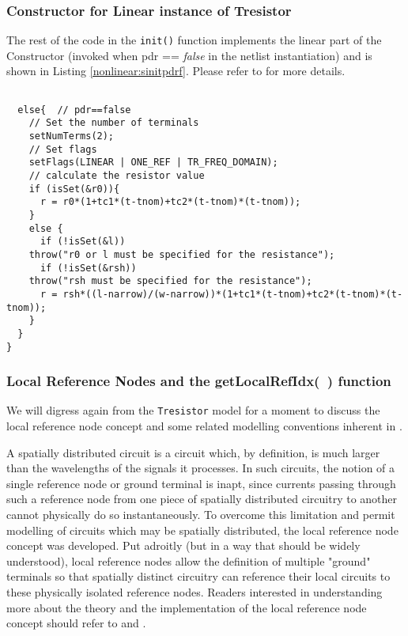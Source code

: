 \subsubsection{Constructor for Linear instance of Tresistor}
The rest of the code in the \texttt{init()} function implements
the linear part of the Constructor (invoked when pdr == \emph{false} in the
netlist instantiation) and is shown in Listing \ref{nonlinear:sinitpdrf}.
Please refer to \cite{l_element} for more details.

\begin{lstlisting}[firstnumber=last, label={nonlinear:sinitpdrf},
    caption={Init function of Tresistor.cc (continued)}]

  else{  // pdr==false
    // Set the number of terminals
    setNumTerms(2);
    // Set flags
    setFlags(LINEAR | ONE_REF | TR_FREQ_DOMAIN);
    // calculate the resistor value
    if (isSet(&r0)){
      r = r0*(1+tc1*(t-tnom)+tc2*(t-tnom)*(t-tnom));
    }
    else {
      if (!isSet(&l))
    throw("r0 or l must be specified for the resistance");
      if (!isSet(&rsh))
    throw("rsh must be specified for the resistance");
      r = rsh*((l-narrow)/(w-narrow))*(1+tc1*(t-tnom)+tc2*(t-tnom)*(t-tnom));
    }
  }
}
\end{lstlisting}

\subsubsection{Local Reference Nodes and the getLocalRefIdx(~) function} \label{nonlinear:locrefidx}
We will digress again from the \texttt{Tresistor} model for a moment to
discuss the local reference node concept and some related
modelling conventions inherent in \FDA.

A spatially distributed circuit is a circuit which, by definition,
is much larger than the wavelengths of the signals it processes.
In such circuits, the notion of a single reference node or ground
terminal is inapt, since currents passing through such a reference
node from one piece of spatially distributed circuitry to another
cannot physically do so instantaneously.  To overcome this limitation
and permit modelling of circuits which may be spatially distributed,
the local reference node concept was developed.  Put adroitly (but
in a way that should be widely understood), local reference nodes
allow the definition of multiple "ground" terminals so that spatially
distinct circuitry can reference their local circuits to these physically
isolated reference nodes.  Readers interested in understanding more
about the theory and the implementation of the local reference node
concept should refer to \cite{lref1} and \cite{lref2}.

